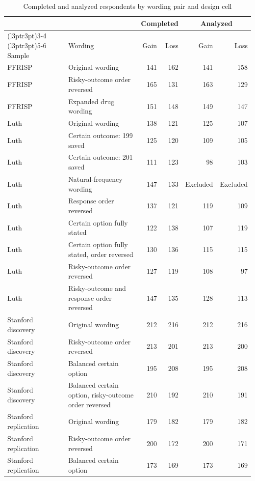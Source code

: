 \begin{table}[H]
\centering
\caption{\label{tab:condition-counts}Completed and analyzed respondents by wording pair and design cell}
\centering
\fontsize{8}{10}\selectfont
\begin{threeparttable}
\begin{tabular}[t]{llrrrr}
\toprule
\multicolumn{2}{c}{ } & \multicolumn{2}{c}{Completed} & \multicolumn{2}{c}{Analyzed} \\
\cmidrule(l{3pt}r{3pt}){3-4} \cmidrule(l{3pt}r{3pt}){5-6}
Sample & Wording & Gain & Loss & Gain & Loss\\
\midrule
FFRISP & Original wording & 141 & 162 & 141 & 158\\
FFRISP & Risky-outcome order reversed & 165 & 131 & 163 & 129\\
FFRISP & Expanded drug wording & 151 & 148 & 149 & 147\\
Luth & Original wording & 138 & 121 & 125 & 107\\
Luth & Certain outcome: 199 saved & 125 & 120 & 109 & 105\\
Luth & Certain outcome: 201 saved & 111 & 123 & 98 & 103\\
Luth & Natural-frequency wording & 147 & 133 & Excluded & Excluded\\
Luth & Response order reversed & 137 & 121 & 119 & 109\\
Luth & Certain option fully stated & 122 & 138 & 107 & 119\\
Luth & Certain option fully stated, order reversed & 130 & 136 & 115 & 115\\
Luth & Risky-outcome order reversed & 127 & 119 & 108 & 97\\
Luth & Risky-outcome and response order reversed & 147 & 135 & 128 & 113\\
Stanford discovery & Original wording & 212 & 216 & 212 & 216\\
Stanford discovery & Risky-outcome order reversed & 213 & 201 & 213 & 200\\
Stanford discovery & Balanced certain option & 195 & 208 & 195 & 208\\
Stanford discovery & Balanced certain option, risky-outcome order reversed & 210 & 192 & 210 & 191\\
Stanford replication & Original wording & 179 & 182 & 179 & 182\\
Stanford replication & Risky-outcome order reversed & 200 & 172 & 200 & 171\\
Stanford replication & Balanced certain option & 173 & 169 & 173 & 169\\

\end{tabular}
\end{threeparttable}
\end{table}
